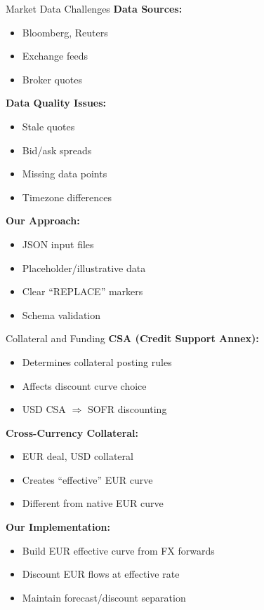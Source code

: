 \documentclass[aspectratio=169,11pt]{beamer}
\begin{document}
\begin{frame}{Market Data Challenges}
\textbf{Data Sources:}
\begin{itemize}
    \item Bloomberg, Reuters
    \item Exchange feeds
    \item Broker quotes
\end{itemize}

\textbf{Data Quality Issues:}
\begin{itemize}
    \item Stale quotes
    \item Bid/ask spreads
    \item Missing data points
    \item Timezone differences
\end{itemize}

\textbf{Our Approach:}
\begin{itemize}
    \item JSON input files
    \item Placeholder/illustrative data
    \item Clear ``REPLACE'' markers
    \item Schema validation
\end{itemize}
\end{frame}

\begin{frame}{Collateral and Funding}
\textbf{CSA (Credit Support Annex):}
\begin{itemize}
    \item Determines collateral posting rules
    \item Affects discount curve choice
    \item USD CSA $\Rightarrow$ SOFR discounting
\end{itemize}

\textbf{Cross-Currency Collateral:}
\begin{itemize}
    \item EUR deal, USD collateral
    \item Creates ``effective'' EUR curve
    \item Different from native EUR curve
\end{itemize}

\textbf{Our Implementation:}
\begin{itemize}
    \item Build EUR effective curve from FX forwards
    \item Discount EUR flows at effective rate
    \item Maintain forecast/discount separation
\end{itemize}
\end{frame}
\end{document}
